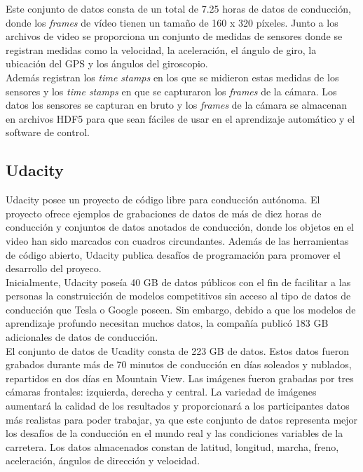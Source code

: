 Este conjunto de datos consta de un total de 7.25 horas de datos de conducción, donde los \textit{frames} de vídeo tienen un tamaño de 160 x 320 píxeles. Junto a los archivos de video se proporciona un conjunto de medidas de sensores donde se registran medidas como la velocidad, la aceleración, el ángulo de giro, la ubicación del GPS y los ángulos del giroscopio.\\

Además registran los \textit{time  stamps} en los que se midieron estas medidas de los sensores y los \textit{time  stamps} en que se capturaron los \textit{frames} de la cámara. Los datos los sensores se capturan en bruto y los \textit{frames} de la cámara se almacenan en archivos HDF5 para que sean fáciles de usar en el aprendizaje automático y el software de control.

\subsection{Udacity}

Udacity posee un proyecto de código libre para conducción autónoma. El proyecto ofrece ejemplos de grabaciones de datos de más de diez horas de conducción y conjuntos de datos anotados de conducción, donde los objetos en el video han sido marcados con cuadros circundantes. Además de las herramientas de código abierto, Udacity publica desafíos de programación para promover el desarrollo del proyeco. \\

Inicialmente, Udacity \cite{udacity-data} poseía 40 GB de datos públicos con el fin de facilitar a las personas la construicción de modelos competitivos sin acceso al tipo de datos de conducción que Tesla o Google poseen. Sin embargo, debido a que los modelos de aprendizaje profundo necesitan muchos datos, la compañía publicó 183 GB adicionales de datos de conducción.\\

El conjunto de datos de Ucadity \cite{udacity-dataset} consta de 223 GB de datos. Estos datos fueron grabados durante más de 70 minutos de conducción en días soleados y nublados, repartidos en dos días en Mountain View. Las imágenes fueron grabadas por tres cámaras frontales: izquierda, derecha y central. La variedad de imágenes aumentará la calidad de los resultados y proporcionará a los participantes datos más realistas para poder trabajar, ya que este conjunto de datos representa mejor los desafíos de la conducción en el mundo real y las condiciones variables de la carretera. Los datos almacenados constan de latitud, longitud, marcha, freno, aceleración, ángulos de dirección y velocidad.



